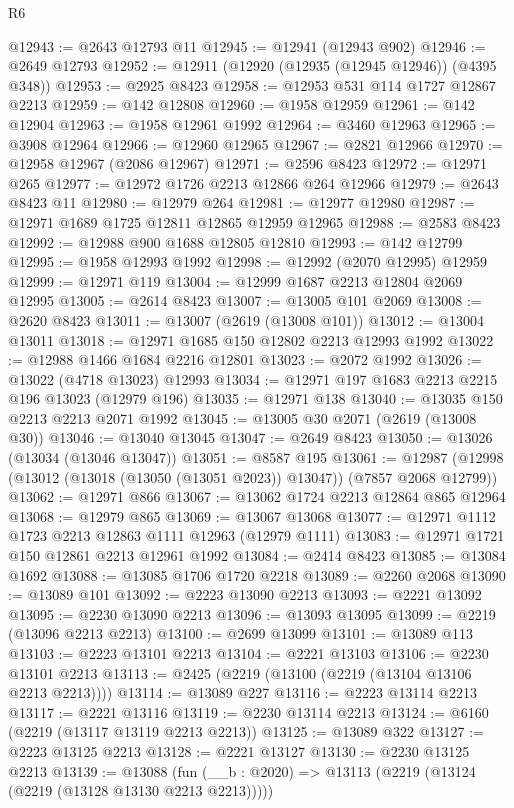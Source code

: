 \begin{lexlean}{R6}
\begin{coremodule}
@12943 := @2643 @12793 @11
@12945 := @12941 (@12943 @902)
@12946 := @2649 @12793
@12952 := @12911 (@12920 (@12935 (@12945 @12946)) (@4395 @348))
@12953 := @2925 @8423
@12958 := @12953 @531 @114 @1727 @12867 @2213
@12959 := @142 @12808
@12960 := @1958 @12959
@12961 := @142 @12904
@12963 := @1958 @12961 @1992
@12964 := @3460 @12963
@12965 := @3908 @12964
@12966 := @12960 @12965
@12967 := @2821 @12966
@12970 := @12958 @12967 (@2086 @12967)
@12971 := @2596 @8423
@12972 := @12971 @265
@12977 := @12972 @1726 @2213 @12866 @264 @12966
@12979 := @2643 @8423 @11
@12980 := @12979 @264
@12981 := @12977 @12980
@12987 := @12971 @1689 @1725 @12811 @12865 @12959 @12965
@12988 := @2583 @8423
@12992 := @12988 @900 @1688 @12805 @12810
@12993 := @142 @12799
@12995 := @1958 @12993 @1992
@12998 := @12992 (@2070 @12995) @12959
@12999 := @12971 @119
@13004 := @12999 @1687 @2213 @12804 @2069 @12995
@13005 := @2614 @8423
@13007 := @13005 @101 @2069
@13008 := @2620 @8423
@13011 := @13007 (@2619 (@13008 @101))
@13012 := @13004 @13011
@13018 := @12971 @1685 @150 @12802 @2213 @12993 @1992
@13022 := @12988 @1466 @1684 @2216 @12801
@13023 := @2072 @1992
@13026 := @13022 (@4718 @13023) @12993
@13034 := @12971 @197 @1683 @2213 @2215 @196 @13023 (@12979 @196)
@13035 := @12971 @138
@13040 := @13035 @150 @2213 @2213 @2071 @1992
@13045 := @13005 @30 @2071 (@2619 (@13008 @30))
@13046 := @13040 @13045
@13047 := @2649 @8423
@13050 := @13026 (@13034 (@13046 @13047))
@13051 := @8587 @195
@13061 := @12987 (@12998 (@13012 (@13018 (@13050 (@13051 @2023)) @13047)) (@7857 @2068 @12799))
@13062 := @12971 @866
@13067 := @13062 @1724 @2213 @12864 @865 @12964
@13068 := @12979 @865
@13069 := @13067 @13068
@13077 := @12971 @1112 @1723 @2213 @12863 @1111 @12963 (@12979 @1111)
@13083 := @12971 @1721 @150 @12861 @2213 @12961 @1992
@13084 := @2414 @8423
@13085 := @13084 @1692
@13088 := @13085 @1706 @1720 @2218
@13089 := @2260 @2068
@13090 := @13089 @101
@13092 := @2223 @13090 @2213
@13093 := @2221 @13092
@13095 := @2230 @13090 @2213
@13096 := @13093 @13095
@13099 := @2219 (@13096 @2213 @2213)
@13100 := @2699 @13099
@13101 := @13089 @113
@13103 := @2223 @13101 @2213
@13104 := @2221 @13103
@13106 := @2230 @13101 @2213
@13113 := @2425 (@2219 (@13100 (@2219 (@13104 @13106 @2213 @2213))))
@13114 := @13089 @227
@13116 := @2223 @13114 @2213
@13117 := @2221 @13116
@13119 := @2230 @13114 @2213
@13124 := @6160 (@2219 (@13117 @13119 @2213 @2213))
@13125 := @13089 @322
@13127 := @2223 @13125 @2213
@13128 := @2221 @13127
@13130 := @2230 @13125 @2213
@13139 := @13088 (fun (__b : @2020) => @13113 (@2219 (@13124 (@2219 (@13128 @13130 @2213 @2213)))))

\end{coremodule}
\end{lexlean}
